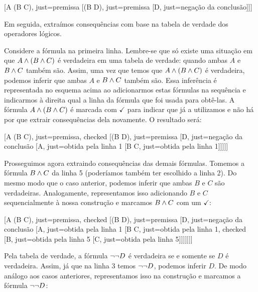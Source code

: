 \begin{center}
\begin{tableau}
	{
	}
	[A \eand (B \eand C), just={premissa}
	[\enot(B \eand D), just={premissa}
	[\enot \enot D, just={negação da conclusão}]]]
\end{tableau}
\end{center}

Em seguida, extraímos consequências com base na tabela de verdade dos operadores lógicos.

Considere a fórmula na primeira linha. Lembre-se que só existe uma situação em que $A \wedge (B \wedge C)$ é verdadeira em uma tabela de verdade: quando ambas $A$ e $B \wedge C$ também são.
Assim, uma vez que temos que $A \wedge (B \wedge C)$ é verdadeira, podemos inferir que  ambas $A$ e $B \wedge C$ também são.
Essa inferência é representada no esquema acima ao adicionarmos estas fórmulas na sequência e indicarmos à direita qual a linha da fórmula que foi usada para obtê-las.
A fórmula $A \wedge (B \wedge C)$  é marcada com $\checkmark$  para indicar que já a utilizamos e não há por que extrair consequências dela novamente.
O resultado será:

\begin{center}
\begin{tableau}
	{
	}
	[A \eand (B \eand C), just={premissa}, checked
	[\enot(B \eand D), just={premissa}
	[\enot \enot D, just={negação da conclusão}
	[A, just={obtida pela linha 1}
	[B \eand C, just={obtida pela linha 1}]]]]]
\end{tableau}
\end{center}

Prosseguimos agora extraindo consequências das demais fórmulas.
Tomemos a fórmula $B \wedge C$ da linha 5 (poderíamos também ter escolhido a linha 2).
Do mesmo modo que o caso anterior, podemos inferir que ambas $B$ e $C$ são verdadeiras.
Analogamente, representamos isso adicionando $B$ e $C$ sequencialmente à nossa construção e marcamos $B \wedge C$ com um $\checkmark$:
\begin{center}
\begin{tableau}
	{
	}
	[A \eand (B \eand C), just={premissa}, checked
	[\enot(B \eand D), just={premissa}
	[\enot \enot D, just={negação da conclusão}
	[A, just={obtida pela linha 1}
	[B \eand C, just={obtida pela linha 1}, checked
	[B, just={obtida pela linha 5}
	[C, just={obtida pela linha 5}]]]]]]]
\end{tableau}
\end{center}


Pela tabela de verdade, a fórmula $\neg \neg D$ é verdadeira se e somente se $D$ é verdadeira.  Assim, já que na linha 3 temos $\neg \neg D$,  podemos inferir $D$. De modo análogo aos casos anteriores, representamos isso na construção e marcamos a fórmula $\neg \neg D$:

